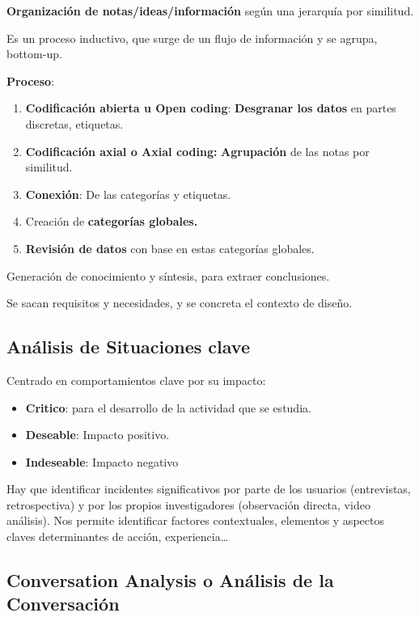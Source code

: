 \documentclass[12pt]{report} %
\begin{document}
\textbf{Organización de notas/ideas/información} según una jerarquía por
similitud.

Es un proceso inductivo, que surge de un flujo de información y se
agrupa, bottom-up.

\textbf{Proceso}:

\begin{enumerate}
\item
  \textbf{Codificación abierta u Open coding}: \textbf{Desgranar los
  datos} en partes discretas, etiquetas.
\item
  \textbf{Codificación axial o Axial coding:} \textbf{Agrupación} de las
  notas por similitud.
\item
  \textbf{Conexión}: De las categorías y etiquetas.
\item
  Creación de \textbf{categorías globales.}
\item
  \textbf{Revisión de datos} con base en estas categorías globales.
\end{enumerate}

Generación de conocimiento y síntesis, para extraer conclusiones.

Se sacan requisitos y necesidades, y se concreta el contexto de diseño.

\subsection{Análisis de Situaciones
clave}

Centrado en comportamientos clave por su impacto:

\begin{itemize}

\item
  \textbf{Critico}: para el desarrollo de la actividad que se estudia.
\item
  \textbf{Deseable}: Impacto positivo.
\item
  \textbf{Indeseable}: Impacto negativo
\end{itemize}

Hay que identificar incidentes significativos por parte de los usuarios
(entrevistas, retrospectiva) y por los propios investigadores
(observación directa, video análisis). Nos permite identificar factores
contextuales, elementos y aspectos claves determinantes de acción,
experiencia\ldots{}

\subsection{Conversation Analysis o Análisis de la
Conversación}
\end{document}
